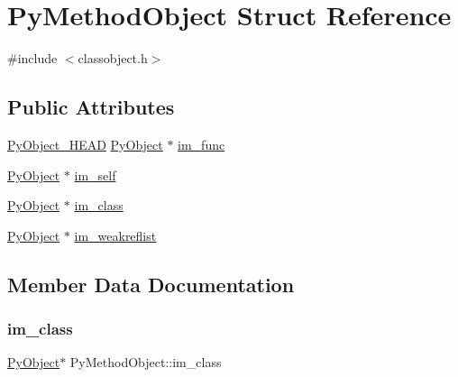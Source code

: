 \hypertarget{struct_py_method_object}{}\section{Py\+Method\+Object Struct Reference}
\label{struct_py_method_object}


{\ttfamily \#include $<$classobject.\+h$>$}

\subsection*{Public Attributes}
\begin{DoxyCompactItemize}
\item 
\mbox{\hyperlink{_python27_2object_8h_a0bf35c1f3ea13f925de94d8593db3b7e}{Py\+Object\+\_\+\+H\+E\+AD}} \mbox{\hyperlink{_python27_2object_8h_aadc84ac7aed2cfa6f20c25f62bf3dac7}{Py\+Object}} $\ast$ \mbox{\hyperlink{struct_py_method_object_a94a16dd58736bda5aff3a5441de6fd40}{im\+\_\+func}}
\item 
\mbox{\hyperlink{_python27_2object_8h_aadc84ac7aed2cfa6f20c25f62bf3dac7}{Py\+Object}} $\ast$ \mbox{\hyperlink{struct_py_method_object_ab269f412ca4beb02b3c3c08ba1732ba5}{im\+\_\+self}}
\item 
\mbox{\hyperlink{_python27_2object_8h_aadc84ac7aed2cfa6f20c25f62bf3dac7}{Py\+Object}} $\ast$ \mbox{\hyperlink{struct_py_method_object_a6a45e86d1c896c5ad310b1f8aa304a9c}{im\+\_\+class}}
\item 
\mbox{\hyperlink{_python27_2object_8h_aadc84ac7aed2cfa6f20c25f62bf3dac7}{Py\+Object}} $\ast$ \mbox{\hyperlink{struct_py_method_object_a723bb6933db81c59f188d65d3156101d}{im\+\_\+weakreflist}}
\end{DoxyCompactItemize}


\subsection{Member Data Documentation}
\mbox{\label{struct_py_method_object_a6a45e86d1c896c5ad310b1f8aa304a9c}} 
\subsubsection{\texorpdfstring{im\_class}{im\_class}}
{\footnotesize\ttfamily \mbox{\hyperlink{_python27_2object_8h_aadc84ac7aed2cfa6f20c25f62bf3dac7}{Py\+Object}}$\ast$ Py\+Method\+Object\+::im\+\_\+class}

